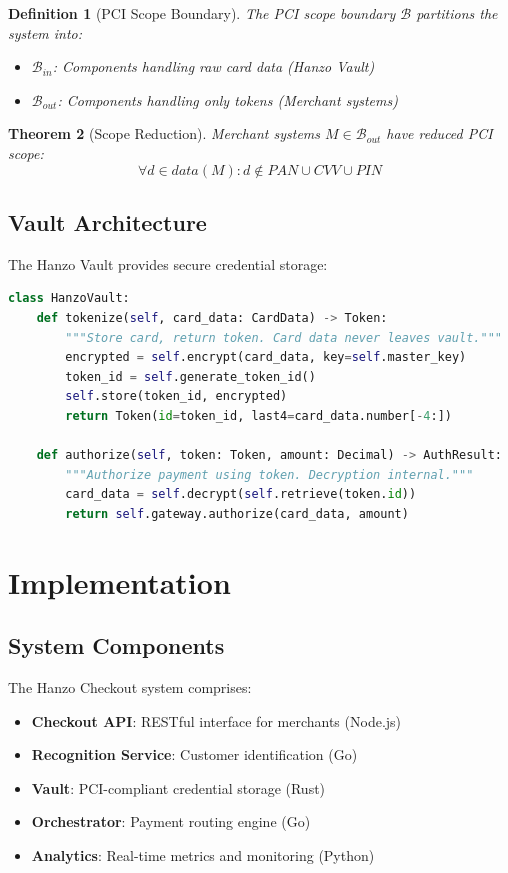 \documentclass[11pt,a4paper]{article}
\newtheorem{theorem}{Theorem}[section]
\newtheorem{definition}[theorem]{Definition}
\begin{document}
\begin{definition}[PCI Scope Boundary]
The PCI scope boundary $\mathcal{B}$ partitions the system into:
\begin{itemize}
    \item $\mathcal{B}_{in}$: Components handling raw card data (Hanzo Vault)
    \item $\mathcal{B}_{out}$: Components handling only tokens (Merchant systems)
\end{itemize}
\end{definition}

\begin{theorem}[Scope Reduction]
Merchant systems $M \in \mathcal{B}_{out}$ have reduced PCI scope:
\[
\forall d \in data(M) : d \notin PAN \cup CVV \cup PIN
\]
\end{theorem}

\subsection{Vault Architecture}

The Hanzo Vault provides secure credential storage:

\begin{lstlisting}[language=Python, caption=Vault Interface]
class HanzoVault:
    def tokenize(self, card_data: CardData) -> Token:
        """Store card, return token. Card data never leaves vault."""
        encrypted = self.encrypt(card_data, key=self.master_key)
        token_id = self.generate_token_id()
        self.store(token_id, encrypted)
        return Token(id=token_id, last4=card_data.number[-4:])

    def authorize(self, token: Token, amount: Decimal) -> AuthResult:
        """Authorize payment using token. Decryption internal."""
        card_data = self.decrypt(self.retrieve(token.id))
        return self.gateway.authorize(card_data, amount)
\end{lstlisting}

\section{Implementation}

\subsection{System Components}

The Hanzo Checkout system comprises:

\begin{itemize}
    \item \textbf{Checkout API}: RESTful interface for merchants (Node.js)
    \item \textbf{Recognition Service}: Customer identification (Go)
    \item \textbf{Vault}: PCI-compliant credential storage (Rust)
    \item \textbf{Orchestrator}: Payment routing engine (Go)
    \item \textbf{Analytics}: Real-time metrics and monitoring (Python)
\end{itemize}
\end{document}
